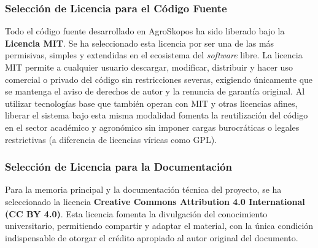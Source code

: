 \subsubsection*{Selección de Licencia para el Código Fuente}
Todo el código fuente desarrollado en AgroSkopos ha sido liberado bajo la \textbf{Licencia MIT}. Se ha seleccionado esta licencia por ser una de las más permisivas, simples y extendidas en el ecosistema del \textit{software} libre. La licencia MIT permite a cualquier usuario descargar, modificar, distribuir y hacer uso comercial o privado del código sin restricciones severas, exigiendo únicamente que se mantenga el aviso de derechos de autor y la renuncia de garantía original. Al utilizar tecnologías base que también operan con MIT y otras licencias afines, liberar el sistema bajo esta misma modalidad fomenta la reutilización del código en el sector académico y agronómico sin imponer cargas burocráticas o legales restrictivas (a diferencia de licencias víricas como GPL).

\subsubsection*{Selección de Licencia para la Documentación}
Para la memoria principal y la documentación técnica del proyecto, se ha seleccionado la licencia \textbf{Creative Commons Attribution 4.0 International (CC BY 4.0)}. Esta licencia fomenta la divulgación del conocimiento universitario, permitiendo compartir y adaptar el material, con la única condición indispensable de otorgar el crédito apropiado al autor original del documento.
